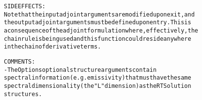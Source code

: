 \begin{alltt}
  SIDE EFFECTS:
       Note that the input adjoint arguments are modified upon exit, and
       the output adjoint arguments must be defined upon entry. This is
       a consequence of the adjoint formulation where, effectively, the
       chain rule is being used and this function could reside anywhere
       in the chain of derivative terms.
 
  COMMENTS:
        - The Options optional structure arguments contain
          spectral information (e.g. emissivity) that must have the same
          spectral dimensionality (the "L" dimension) as the RTSolution
          structures.
 
  \end{alltt}
